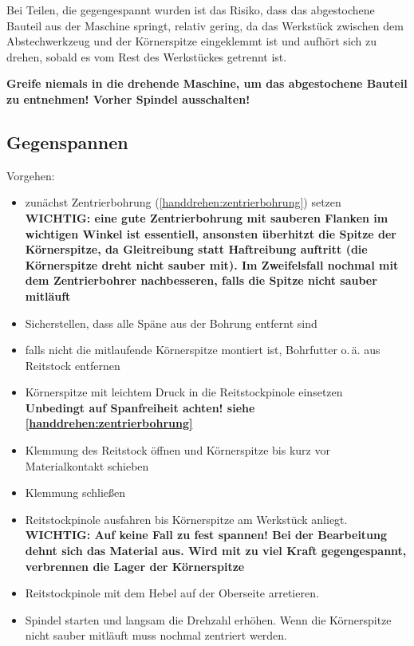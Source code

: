 \documentclass{\basedir/fablab-document}
\begin{document}
Bei Teilen, die gegengespannt wurden ist das Risiko, dass das abgestochene Bauteil aus der Maschine springt, relativ gering, da das Werkstück zwischen dem Abstechwerkzeug und der Körnerspitze eingeklemmt ist und aufhört sich zu drehen, sobald es vom Rest des Werkstückes getrennt ist.

\textbf{Greife niemals in die drehende Maschine, um das abgestochene Bauteil zu entnehmen! Vorher Spindel ausschalten!}


\subsection{Gegenspannen}
\label{handdrehen:gegenspannen}

Vorgehen:
\begin{itemize}
\item zunächst Zentrierbohrung (\ref{handdrehen:zentrierbohrung}) setzen\\
\textbf{WICHTIG: eine gute Zentrierbohrung mit sauberen Flanken im wichtigen Winkel ist essentiell, ansonsten überhitzt die Spitze der Körnerspitze, da Gleitreibung statt Haftreibung auftritt (die Körnerspitze dreht nicht sauber mit). Im Zweifelsfall nochmal mit dem Zentrierbohrer nachbesseren, falls die Spitze nicht sauber mitläuft}
\item Sicherstellen, dass alle Späne aus der Bohrung entfernt sind
\item falls nicht die mitlaufende Körnerspitze montiert ist, Bohrfutter o.\,ä. aus Reitstock entfernen
\item Körnerspitze mit leichtem Druck in die Reitstockpinole einsetzen\\
\textbf{Unbedingt auf Spanfreiheit achten! siehe \ref{handdrehen:zentrierbohrung}}
\item Klemmung des Reitstock öffnen und Körnerspitze bis kurz vor Materialkontakt schieben 
\item Klemmung schließen
\item Reitstockpinole ausfahren bis Körnerspitze am Werkstück anliegt.\\ \textbf{WICHTIG: Auf keine Fall zu fest spannen! Bei der Bearbeitung dehnt sich das Material aus. Wird mit zu viel Kraft gegengespannt, verbrennen die Lager der Körnerspitze}
\item Reitstockpinole mit dem Hebel auf der Oberseite arretieren.
\item Spindel starten und langsam die Drehzahl erhöhen. Wenn die Körnerspitze nicht sauber mitläuft muss nochmal zentriert werden.
\end{itemize}
\end{document}
